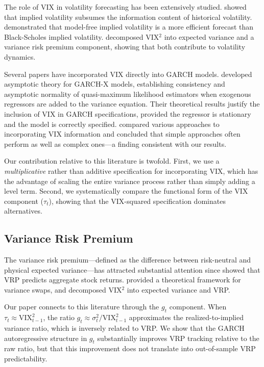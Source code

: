 \documentclass[12pt,a4paper]{article}
\begin{document}
The role of VIX in volatility forecasting has been extensively studied. \citet{christensen1998} showed that implied volatility subsumes the information content of historical volatility. \citet{jiang2005} demonstrated that model-free implied volatility is a more efficient forecast than Black-Scholes implied volatility. \citet{bekaert2014} decomposed VIX$^2$ into expected variance and a variance risk premium component, showing that both contribute to volatility dynamics.

Several papers have incorporated VIX directly into GARCH models. \citet{han2014} developed asymptotic theory for GARCH-X models, establishing consistency and asymptotic normality of quasi-maximum likelihood estimators when exogenous regressors are added to the variance equation. Their theoretical results justify the inclusion of VIX in GARCH specifications, provided the regressor is stationary and the model is correctly specified. \citet{bayer2020} compared various approaches to incorporating VIX information and concluded that simple approaches often perform as well as complex ones---a finding consistent with our results.

Our contribution relative to this literature is twofold. First, we use a \emph{multiplicative} rather than additive specification for incorporating VIX, which has the advantage of scaling the entire variance process rather than simply adding a level term. Second, we systematically compare the functional form of the VIX component ($\tau_t$), showing that the VIX-squared specification dominates alternatives.

\subsection{Variance Risk Premium}

The variance risk premium---defined as the difference between risk-neutral and physical expected variance---has attracted substantial attention since \citet{bollerslev2009} showed that VRP predicts aggregate stock returns. \citet{carr2009} provided a theoretical framework for variance swaps, and \citet{bekaert2014} decomposed VIX$^2$ into expected variance and VRP.

Our paper connects to this literature through the $g_t$ component. When $\tau_t \approx \mathrm{VIX}_{t-1}^2$, the ratio $g_t \approx \sigma_t^2 / \mathrm{VIX}_{t-1}^2$ approximates the realized-to-implied variance ratio, which is inversely related to VRP. We show that the GARCH autoregressive structure in $g_t$ substantially improves VRP tracking relative to the raw ratio, but that this improvement does not translate into out-of-sample VRP predictability.
\end{document}
